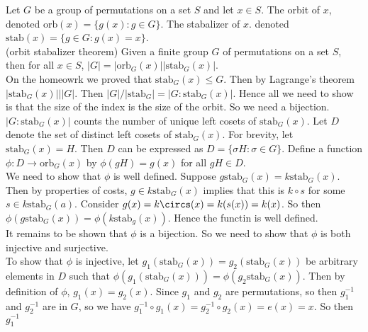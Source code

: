 \documentclass{article}
\newcommand{\stab}{\mbox{stab}}
\newcommand{\orb}{\mbox{orb}}
\begin{document}
 Let $G$ be a group of permutations on a set $S$ and let $x\in S$. The orbit of $x$, denoted $\orb(x) = \{g(x):g\in G\}$. The stabalizer of $x$. denoted $\stab(x) = \{g\in G: g(x) = x\}$. \\

 (orbit stabalizer theorem) Given a finite group $G$ of permutations on a set $S$, then for all $x\in S$, $|G| = |\orb_G(x)||\stab_G(x)|$.\\

 On the homeowrk we proved that $\stab_G(x)\le G$. Then by Lagrange's theorem $|\stab_G(x)|\big | |G|$. Then $|G|/|\stab_G| = |G:\stab_G(x)|$. Hence all we need to show is that the size of the index is the size of the orbit. So we need a bijection.\\

$|G:\stab_G(x)|$ counts the number of unique left cosets of $\stab_G(x)$. Let $D$ denote the set of distinct left cosets of $\stab_G(x)$. For brevity, let $\stab_G(x) = H$. Then $D$ can be expressed as $D = \{\sigma H : \sigma\in G\}$. Define a function $\phi:D\rightarrow \orb_G(x)$ by $\phi(gH) = g(x)$ for all $gH\in D$.\\

We need to show that $\phi$ is well defined. Suppose $g\stab_G(x) = k\stab_G(x)$.  Then by properties of costs, $g\in k\stab_G(x)$ implies that this is $k\circ s$ for some $s\in k\stab_G(a)$. Consider $g(x) = k\circs(x) = k(s(x)) = k(x)$. So then $\phi(g\stab_G(x)) = \phi(k\stab_g(x))$. Hence the functin is well defined. \\

It remains to be shown that $\phi$ is a bijection. So we need to show that $\phi$ is both injective and surjective.\\

To show that $\phi$ is injective, let $g_1(\stab_G(x)) = g_2(\stab_G(x))$ be arbitrary elements in $D$ such that $\phi(g_1(\stab_G(x))) = \phi(g_2\stab_G(x)).$  Then by definition of $\phi$, $g_1(x) = g_2(x)$. Since $g_1$ and $g_2$ are permutations, so then $g_1^{-1}$ and $g_2^{-1}$ are in $G$, so we have $g_1^{-1}\circ g_1(x) = g_2^{-1}\circ g_2(x) = e(x) = x$. So then $g_1^{-1}$\\
\end{document}
